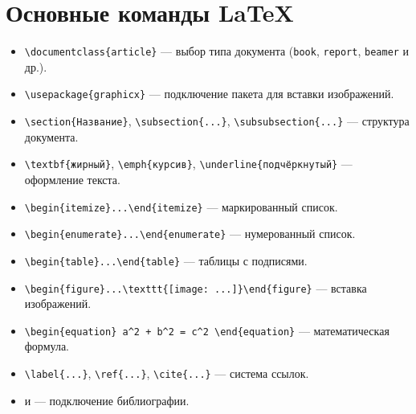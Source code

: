 \documentclass[a4paper,12pt]{report}
\begin{document}
\section{Основные команды \LaTeX}
\begin{itemize}[noitemsep]
    \item \verb|\documentclass{article}| — выбор типа документа (\verb|book|, \verb|report|, \verb|beamer| и др.).
    \item \verb|\usepackage{graphicx}| — подключение пакета для вставки изображений.
    \item \verb|\section{Название}|, \verb|\subsection{...}|, \verb|\subsubsection{...}| — структура документа.
    \item \verb|\textbf{жирный}|, \verb|\emph{курсив}|, \verb|\underline{подчёркнутый}| — оформление текста.
    \item \verb|\begin{itemize}...\end{itemize}| — маркированный список.
    \item \verb|\begin{enumerate}...\end{enumerate}| — нумерованный список.
    \item \verb|\begin{table}...\end{table}| — таблицы с подписями.
    \item \verb|\begin{figure}...\texttt{[image: ...]}\end{figure}| — вставка изображений.
    \item \verb|\begin{equation} a^2 + b^2 = c^2 \end{equation}| — математическая формула.
    \item \verb|\label{...}|, \verb|\ref{...}|, \verb|\cite{...}| — система ссылок.
    \item \verb|| и \verb|| — подключение библиографии.
\end{itemize}
\end{document}
